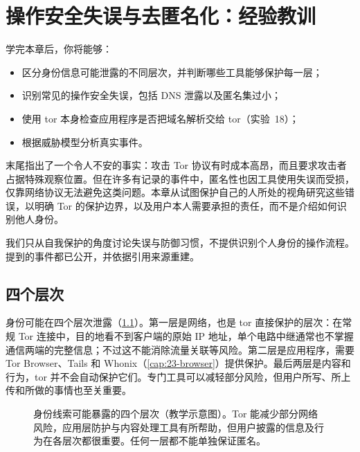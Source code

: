 \chapter{操作安全失误与去匿名化：经验教训}\label{cap:28-opsec}

\begin{obiettivi}
学完本章后，你将能够：
\begin{itemize}[nosep]
  \item 区分身份信息可能泄露的不同层次，并判断哪些工具能够保护每一层；
  \item 识别常见的操作安全失误，包括 DNS 泄露以及匿名集过小；
  \item 使用 tor 本身检查应用程序是否把域名解析交给 tor（实验~18）；
  \item 根据威胁模型分析真实事件。
\end{itemize}
\end{obiettivi}

 末尾指出了一个令人不安的事实：攻击 Tor 协议有时成本高昂，而且要求攻击者占据特殊观察位置。但在许多有记录的事件中，匿名性也因工具使用失误而受损，仅靠网络协议无法避免这类问题。本章从试图保护自己的人所处的视角研究这些错误，以明确 Tor 的保护边界，以及用户本人需要承担的责任，而不是介绍如何识别他人身份。

\begin{attenzione}[本章的讨论范围]
我们只从自我保护的角度讨论失误与防御习惯，不提供识别个人身份的操作流程。提到的事件都已公开，并依据引用来源重建。
\end{attenzione}

\section{四个层次}\label{sec:opsec-livelli}

身份可能在四个层次泄露（\cref{fig:livelli}）。第一层是网络，也是 tor 直接保护的层次：在常规 Tor 连接中，目的地看不到客户端的原始 IP 地址，单个电路中继通常也不掌握通信两端的完整信息；不过这不能消除流量关联等风险。第二层是应用程序，需要 Tor Browser、Tails 和 Whonix（\cref{cap:23-browser}）提供保护。最后两层是内容和行为，tor 并不会自动保护它们。专门工具可以减轻部分风险，但用户所写、所上传和所做的事情也至关重要。

\begin{figure}[htbp]
\centering

\caption{身份线索可能暴露的四个层次（教学示意图）。Tor 能减少部分网络风险，应用层防护与内容处理工具有所帮助，但用户披露的信息及行为在各层次都很重要。任何一层都不能单独保证匿名。}
\label{fig:livelli}
\end{figure}

